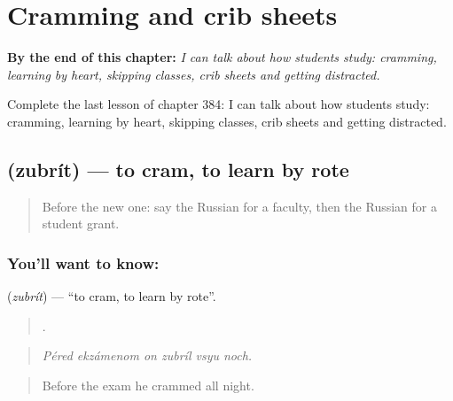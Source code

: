 
\chapter{Cramming and crib sheets}
\label{ch:ru-cramming-and-crib-sheets}

\begin{chapteropening}
\textbf{By the end of this chapter:} \emph{I can talk about how students study: cramming, learning by heart, skipping classes, crib sheets and getting distracted.}

Complete the last lesson of chapter 384: I can talk about how students study: cramming, learning by heart, skipping classes, crib sheets and getting distracted.
\end{chapteropening}

\section[\texorpdfstring{\ru{зубрить} (zubrít)}{зубрить (zubrít)}]{ (zubrít) — to cram, to learn by rote}

\label{lesson:RU-C384-zubrit}



\begin{quote}
Before the new one: say the Russian for a faculty, then the Russian for a student grant.
\end{quote}

\subsection*{You'll want to know: }
\textbf{} (\emph{zubrít}) — \textquotedblleft{}to cram, to learn by rote\textquotedblright{}.

\begin{quote}
     .
\end{quote}

\begin{quote}
\emph{Péred ekzámenom on zubríl vsyu noch.}
\end{quote}

\begin{quote}
Before the exam he crammed all night.
\end{quote}

